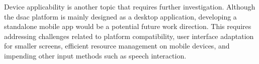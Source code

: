Device applicability is another topic that requires further
investigation. Although the \gls{dsac} platform is mainly designed as a
desktop application, developing a standalone mobile app would be a
potential future work direction. This requires addressing challenges
related to platform compatibility, user interface adaptation for smaller
screens, efficient resource management on mobile devices, and impending
other input methods such as speech interaction.
